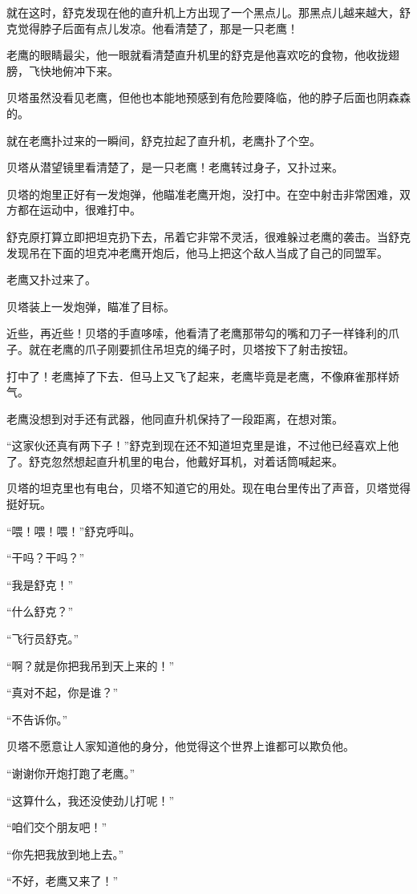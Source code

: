 \documentclass[a4paper,12pt,UTF8,twoside]{ctexbook}
\begin{document}
就在这时，舒克发现在他的直升机上方出现了一个黑点儿。那黑点儿越来越大，舒克觉得脖子后面有点儿发凉。他看清楚了，那是一只老鹰！

老鹰的眼睛最尖，他一眼就看清楚直升机里的舒克是他喜欢吃的食物，他收拢翅膀，飞快地俯冲下来。

贝塔虽然没看见老鹰，但他也本能地预感到有危险要降临，他的脖子后面也阴森森的。

就在老鹰扑过来的一瞬间，舒克拉起了直升机，老鹰扑了个空。

贝塔从潜望镜里看清楚了，是一只老鹰！老鹰转过身子，又扑过来。

贝塔的炮里正好有一发炮弹，他瞄准老鹰开炮，没打中。在空中射击非常困难，双方都在运动中，很难打中。

舒克原打算立即把坦克扔下去，吊着它非常不灵活，很难躲过老鹰的袭击。当舒克发现吊在下面的坦克冲老鹰开炮后，他马上把这个敌人当成了自己的同盟军。

老鹰又扑过来了。

贝塔装上一发炮弹，瞄准了目标。

近些，再近些！贝塔的手直哆嗦，他看清了老鹰那带勾的嘴和刀子一样锋利的爪子。就在老鹰的爪子刚要抓住吊坦克的绳子时，贝塔按下了射击按钮。

打中了！老鹰掉了下去．但马上又飞了起来，老鹰毕竟是老鹰，不像麻雀那样娇气。

老鹰没想到对手还有武器，他同直升机保持了一段距离，在想对策。

“这家伙还真有两下子！”舒克到现在还不知道坦克里是谁，不过他已经喜欢上他了。舒克忽然想起直升机里的电台，他戴好耳机，对着话筒喊起来。

贝塔的坦克里也有电台，贝塔不知道它的用处。现在电台里传出了声音，贝塔觉得挺好玩。

“喂！喂！喂！”舒克呼叫。

“干吗？干吗？”

“我是舒克！”

“什么舒克？”

“飞行员舒克。”

“啊？就是你把我吊到天上来的！”

“真对不起，你是谁？”

“不告诉你。”

贝塔不愿意让人家知道他的身分，他觉得这个世界上谁都可以欺负他。

“谢谢你开炮打跑了老鹰。”

“这算什么，我还没使劲儿打呢！”

“咱们交个朋友吧！”

“你先把我放到地上去。”

“不好，老鹰又来了！”
\end{document}
